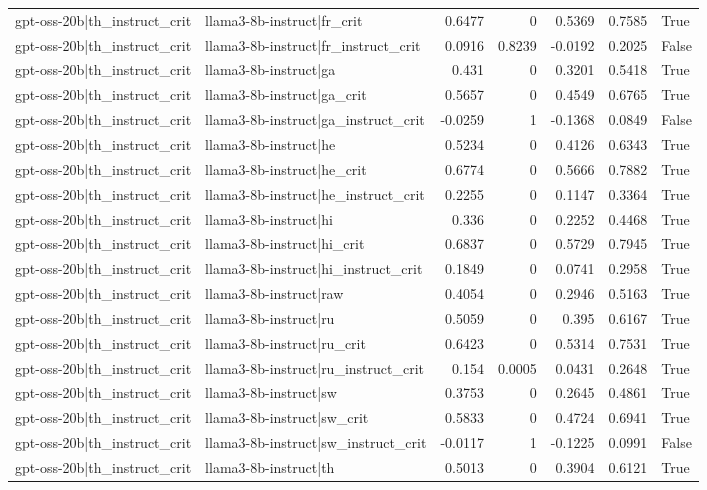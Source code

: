 \begin{table}
\begin{tabular}{l l r r r r l}
gpt-oss-20b|th_instruct_crit & llama3-8b-instruct|fr_crit & 0.6477 & 0 & 0.5369 & 0.7585 & True \\
gpt-oss-20b|th_instruct_crit & llama3-8b-instruct|fr_instruct_crit & 0.0916 & 0.8239 & -0.0192 & 0.2025 & False \\
gpt-oss-20b|th_instruct_crit & llama3-8b-instruct|ga & 0.431 & 0 & 0.3201 & 0.5418 & True \\
gpt-oss-20b|th_instruct_crit & llama3-8b-instruct|ga_crit & 0.5657 & 0 & 0.4549 & 0.6765 & True \\
gpt-oss-20b|th_instruct_crit & llama3-8b-instruct|ga_instruct_crit & -0.0259 & 1 & -0.1368 & 0.0849 & False \\
gpt-oss-20b|th_instruct_crit & llama3-8b-instruct|he & 0.5234 & 0 & 0.4126 & 0.6343 & True \\
gpt-oss-20b|th_instruct_crit & llama3-8b-instruct|he_crit & 0.6774 & 0 & 0.5666 & 0.7882 & True \\
gpt-oss-20b|th_instruct_crit & llama3-8b-instruct|he_instruct_crit & 0.2255 & 0 & 0.1147 & 0.3364 & True \\
gpt-oss-20b|th_instruct_crit & llama3-8b-instruct|hi & 0.336 & 0 & 0.2252 & 0.4468 & True \\
gpt-oss-20b|th_instruct_crit & llama3-8b-instruct|hi_crit & 0.6837 & 0 & 0.5729 & 0.7945 & True \\
gpt-oss-20b|th_instruct_crit & llama3-8b-instruct|hi_instruct_crit & 0.1849 & 0 & 0.0741 & 0.2958 & True \\
gpt-oss-20b|th_instruct_crit & llama3-8b-instruct|raw & 0.4054 & 0 & 0.2946 & 0.5163 & True \\
gpt-oss-20b|th_instruct_crit & llama3-8b-instruct|ru & 0.5059 & 0 & 0.395 & 0.6167 & True \\
gpt-oss-20b|th_instruct_crit & llama3-8b-instruct|ru_crit & 0.6423 & 0 & 0.5314 & 0.7531 & True \\
gpt-oss-20b|th_instruct_crit & llama3-8b-instruct|ru_instruct_crit & 0.154 & 0.0005 & 0.0431 & 0.2648 & True \\
gpt-oss-20b|th_instruct_crit & llama3-8b-instruct|sw & 0.3753 & 0 & 0.2645 & 0.4861 & True \\
gpt-oss-20b|th_instruct_crit & llama3-8b-instruct|sw_crit & 0.5833 & 0 & 0.4724 & 0.6941 & True \\
gpt-oss-20b|th_instruct_crit & llama3-8b-instruct|sw_instruct_crit & -0.0117 & 1 & -0.1225 & 0.0991 & False \\
gpt-oss-20b|th_instruct_crit & llama3-8b-instruct|th & 0.5013 & 0 & 0.3904 & 0.6121 & True \\

\end{tabular}
\end{table}
